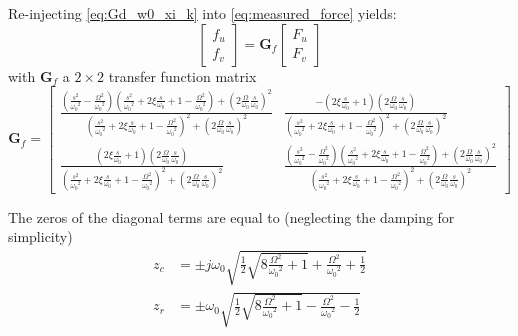 \documentclass{ISMA_USD2020}
\begin{document}
Re-injecting \eqref{eq:Gd_w0_xi_k} into \eqref{eq:measured_force} yields:
\begin{equation}
\label{eq:Gf_mimo_tf}
  \begin{bmatrix} f_{u} \\ f_{v} \end{bmatrix} = \bm{G}_{f} \begin{bmatrix} F_u \\ F_v \end{bmatrix}
\end{equation}
with \(\bm{G}_f\) a \(2 \times 2\) transfer function matrix
\begin{equation}
\label{eq:Gf}
  \bm{G}_{f} = \begin{bmatrix}
  \frac{\left( \frac{s^2}{{\omega_0}^2} - \frac{\Omega^2}{{\omega_0}^2} \right) \left( \frac{s^2}{{\omega_0}^2} + 2 \xi \frac{s}{\omega_0} + 1 - \frac{{\Omega}^2}{{\omega_0}^2} \right) + \left( 2 \frac{\Omega}{\omega_0} \frac{s}{\omega_0} \right)^2}{\left( \frac{s^2}{{\omega_0}^2} + 2 \xi \frac{s}{\omega_0} + 1 - \frac{{\Omega}^2}{{\omega_0}^2} \right)^2 + \left( 2 \frac{\Omega}{\omega_0} \frac{s}{\omega_0} \right)^2} & \frac{- \left( 2 \xi \frac{s}{\omega_0} + 1 \right) \left( 2 \frac{\Omega}{\omega_0} \frac{s}{\omega_0} \right)}{\left( \frac{s^2}{{\omega_0}^2} + 2 \xi \frac{s}{\omega_0} + 1 - \frac{{\Omega}^2}{{\omega_0}^2} \right)^2 + \left( 2 \frac{\Omega}{\omega_0} \frac{s}{\omega_0} \right)^2} \\
  \frac{\left( 2 \xi \frac{s}{\omega_0} + 1 \right) \left( 2 \frac{\Omega}{\omega_0} \frac{s}{\omega_0} \right)}{\left( \frac{s^2}{{\omega_0}^2} + 2 \xi \frac{s}{\omega_0} + 1 - \frac{{\Omega}^2}{{\omega_0}^2} \right)^2 + \left( 2 \frac{\Omega}{\omega_0} \frac{s}{\omega_0} \right)^2} & \frac{\left( \frac{s^2}{{\omega_0}^2} - \frac{\Omega^2}{{\omega_0}^2} \right) \left( \frac{s^2}{{\omega_0}^2} + 2 \xi \frac{s}{\omega_0} + 1 - \frac{{\Omega}^2}{{\omega_0}^2} \right) + \left( 2 \frac{\Omega}{\omega_0} \frac{s}{\omega_0} \right)^2}{\left( \frac{s^2}{{\omega_0}^2} + 2 \xi \frac{s}{\omega_0} + 1 - \frac{{\Omega}^2}{{\omega_0}^2} \right)^2 + \left( 2 \frac{\Omega}{\omega_0} \frac{s}{\omega_0} \right)^2}
\end{bmatrix}
\end{equation}

The zeros of the diagonal terms are equal to (neglecting the damping for simplicity)
\begin{subequations}
  \begin{align}
    z_c &= \pm j \omega_0 \sqrt{\frac{1}{2} \sqrt{8 \frac{\Omega^2}{{\omega_0}^2} + 1} + \frac{\Omega^2}{{\omega_0}^2} + \frac{1}{2} } \label{eq:iff_zero_cc} \\
    z_r &= \pm   \omega_0 \sqrt{\frac{1}{2} \sqrt{8 \frac{\Omega^2}{{\omega_0}^2} + 1} - \frac{\Omega^2}{{\omega_0}^2} - \frac{1}{2} } \label{eq:iff_zero_real}
  \end{align}
\end{subequations}
\end{document}
